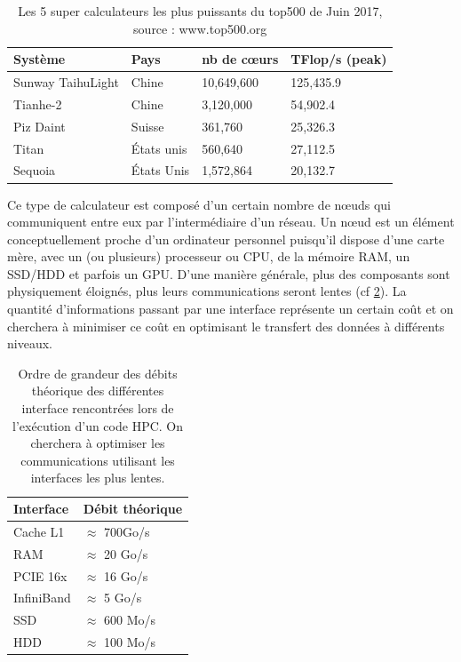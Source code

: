 \begin{table}
\begin{tabular}{ l l l l }
\hline 
Système & Pays & nb de cœurs & TFlop/s (peak) \\
\hline 
Sunway TaihuLight & Chine & 10,649,600 & 125,435.9 \\ 
Tianhe-2  & Chine & 3,120,000 & 54,902.4 \\ 
Piz Daint  & Suisse & 361,760 & 25,326.3 \\ 
Titan  & États unis & 560,640 & 27,112.5 \\ 
Sequoia  & États Unis &1,572,864 & 20,132.7 \\ 
\end{tabular} 
\caption[TOP500]{Les 5 super calculateurs les plus puissants du top500 de Juin 2017, source : www.top500.org}
\label{tab:top500}
\end{table}

Ce type de calculateur est composé d'un certain nombre de nœuds qui communiquent entre eux par l'intermédiaire d'un réseau.
Un nœud est un élément conceptuellement proche d'un ordinateur personnel puisqu'il dispose d'une carte mère, avec un (ou plusieurs) processeur ou \ac{CPU}, de la mémoire RAM, un SSD/HDD et parfois un \ac{GPU}.
D'une manière générale, plus des composants sont physiquement éloignés, plus leurs communications seront lentes (cf \ref{tab:debits}).
La quantité d'informations passant par une interface représente un certain coût et on cherchera à minimiser ce coût en optimisant le transfert des données à différents niveaux.

\begin{table}
\begin{tabular}{ l l }
\hline 
Interface  & Débit théorique \\
\hline 
Cache L1 & $\approx$ 700Go/s \\
RAM & $\approx$ 20 Go/s \\ 
PCIE 16x & $\approx$ 16 Go/s \\
InfiniBand & $\approx$ 5 Go/s \\
SSD & $\approx$ 600 Mo/s \\
HDD & $\approx$ 100 Mo/s
\end{tabular} 
\caption[Débits interfaces HPC]{Ordre de grandeur des débits théorique des différentes interface rencontrées lors de l'exécution d'un code \ac{HPC}.
On cherchera à optimiser les communications utilisant les interfaces les plus lentes.}
\label{tab:debits}
\end{table}

